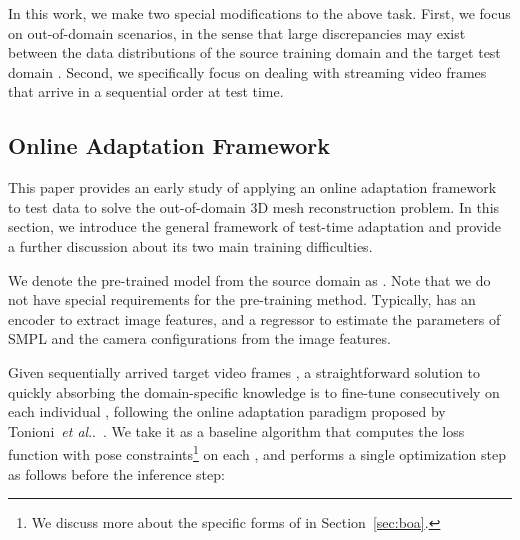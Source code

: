 \documentclass[10pt,journal,compsoc]{IEEEtran}
\makeatletter
\DeclareRobustCommand\onedot{\futurelet\@let@token\@onedot}
\def\@onedot{\ifx\@let@token.\else.\null\fi\xspace}
\def\etal{\emph{et al}\onedot}
\newcommand{\sect}[1]{Section~\ref{#1}}
\makeatother
\begin{document}
In this work, we make two special modifications to the above task. First, we focus on out-of-domain scenarios, in the sense that large discrepancies may exist between the data distributions of the source training domain  and the target test domain . 
Second, we specifically focus on dealing with streaming video frames  that arrive in a sequential order at test time.






\subsection{Online Adaptation Framework} 
\label{sec:online_adaptation}
This paper provides an early study of applying an online adaptation framework to test data to solve the out-of-domain 3D mesh reconstruction problem.
In this section, we introduce the general framework of test-time adaptation and provide a further discussion about its two main training difficulties. 


We denote the pre-trained model from the source domain as .
Note that we do not have special requirements for the pre-training method.
Typically,  has an encoder to extract image features, and a regressor to estimate the parameters of SMPL and the camera configurations from the image features.


Given sequentially arrived target video frames , a straightforward solution to quickly absorbing the domain-specific knowledge is to fine-tune  consecutively on each individual , following the online adaptation paradigm proposed by Tonioni~\etal~\cite{tonioni2019real}. 
We take it as a baseline algorithm that computes the loss function  with pose constraints\footnote{We discuss more about the specific forms of  in \sect{sec:boa}.} on each , and performs a single optimization step as follows before the inference step:
\end{document}
